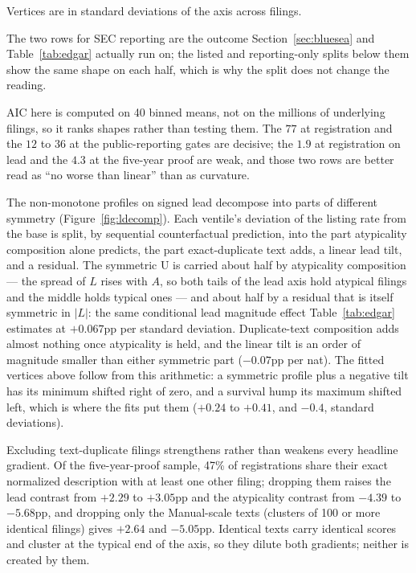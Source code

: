 Vertices are in standard deviations of the axis across filings.

The two rows for SEC reporting are the outcome Section~\ref{sec:bluesea} and
Table~\ref{tab:edgar} actually run on; the listed and reporting-only splits
below them show the same shape on each half, which is why the split does not
change the reading.

AIC here is computed on 40 binned means, not on the millions of underlying
filings, so it ranks shapes rather than testing them. The $77$ at registration
and the $12$ to $36$ at the public-reporting gates are decisive; the $1.9$ at
registration on lead and the $4.3$ at the five-year proof are weak, and those
two rows are better read as ``no worse than linear'' than as curvature.

The non-monotone profiles on signed lead decompose into parts of
different symmetry (Figure~\ref{fig:ldecomp}). Each ventile's deviation
of the listing rate from the base is split, by sequential counterfactual
prediction, into the part atypicality composition alone predicts, the
part exact-duplicate text adds, a linear lead tilt, and a residual. The
symmetric U is carried about half by atypicality composition --- the
spread of $L$ rises with $A$, so both tails of the lead axis hold
atypical filings and the middle holds typical ones --- and about half by
a residual that is itself symmetric in $|L|$: the same conditional lead
magnitude effect Table~\ref{tab:edgar} estimates at $+0.067$pp per
standard deviation. Duplicate-text composition adds almost nothing once
atypicality is held, and the linear tilt is an order of magnitude smaller
than either symmetric part ($-0.07$pp per nat). The fitted vertices above
follow from this arithmetic: a symmetric profile plus a negative tilt has
its minimum shifted right of zero, and a survival hump its maximum
shifted left, which is where the fits put them ($+0.24$ to $+0.41$, and
$-0.4$, standard deviations).

Excluding text-duplicate filings strengthens rather than weakens every
headline gradient. Of the five-year-proof sample, 47\% of registrations
share their exact normalized description with at least one other filing;
dropping them raises the lead contrast from $+2.29$ to $+3.05$pp and the
atypicality contrast from $-4.39$ to $-5.68$pp, and dropping only the
Manual-scale texts (clusters of 100 or more identical filings) gives
$+2.64$ and $-5.05$pp. Identical texts carry identical scores and
cluster at the typical end of the axis, so they dilute both gradients;
neither is created by them.

